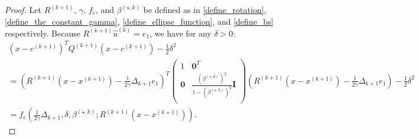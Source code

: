 \documentclass{article}
\theoremstyle{case}
\numberwithin{theorem}{subsection}
\newcommand{\bs}{{\beta^{(\star, k)}}}
\newcommand{\ck}{{c^{(k)}}}
\newcommand{\dk}{\Delta_k}
\newcommand{\dkpo}{\Delta_{k+1}}
\newcommand{\huk}{{{\hat u}^{(k)}}}
\newcommand{\qk}{{Q^{(k)}}}
\newcommand{\rotk}{{R^{(k+1)}}}
\newcommand{\sdk}{{\delta_k}}
\newcommand{\xkpo}{{{x}^{(k+1)}}}
\newcommand{\xk}{x^{(k)}}
\newcommand{\qkpo}{{Q^{(k+1)}}}
\newcommand{\ckpo}{{c^{(k+1)}}}
\begin{document}
\begin{proof}
Let $\rotk$, $\gamma$, $f_e$, and $\bs$ be defined as in \cref{define_rotation}, \cref{define_the_constant_gamma}, \cref{define_ellipse_function}, and \cref{define_bs} respectively.
Because $\rotk\huk = e_1$, we have for any $\delta > 0$:
\begin{align*}
\left(x - \ckpo\right)^T\qkpo\left(x - \ckpo\right) - \frac 1 2 \delta^2 \\
= \left(\rotk\left(x-\xkpo\right) - \frac 1 {2\gamma} \dkpo e_1\right)^T\begin{pmatrix}
1 & \boldsymbol0^T \\
\boldsymbol 0 & \frac{\left(\bs\right)^2}{1 - \left(\bs\right)^2} \boldsymbol I \\
\end{pmatrix} \left(\rotk\left(x-\xkpo\right) - \frac 1 {2\gamma} \dkpo e_1\right) - \frac 1 2 \delta^2 \\
= f_e\left(\frac 1 {2\gamma} \dkpo, \delta, \bs; \rotk\left(x - \xkpo\right)\right).
\end{align*}




\end{proof}
\end{document}
